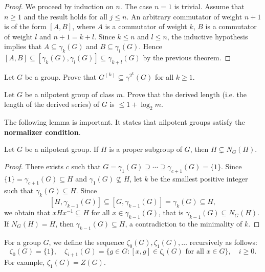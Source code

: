 \begin{proof}
We proceed by induction on $n$. The case $n=1$ is trivial. Assume that $n\geq1$ and 
the result holds for all $j\leq n$. An arbitrary commutator of weight $n+1$ 
is of the form $[A,B]$, where $A$ is a commutator of weight $k$,
$B$ is a commutator of weight $l$ and $n+1=k+l$. Since $k\leq n$ and $l\leq n$, 
the inductive hypothesis implies that  $A\subseteq \gamma_k(G)$ and $B\subseteq
\gamma_l(G)$. Hence $[A,B]\subseteq [\gamma_k(G),\gamma_l(G)]\subseteq
\gamma_{k+l}(G)$ by the previous theorem.
\end{proof}

\begin{exercise}
\label{xca:inclusion}
    Let $G$ be a group. Prove that $G^{(k)}\subseteq \gamma^{2^k}(G)$ for all $k\geq1$. 
\end{exercise}

\begin{exercise}
\label{xca:derived_length}
    Let $G$ be a nilpotent group of class $m$. Prove that
    the derived length (i.e. 
    the length of the derived series) of $G$ is $\leq 1+\log_2m$.
\end{exercise}

The following lemma is important. It states that nilpotent groups satisfy 
the \textbf{normalizer condition}. 

\begin{lemma}
\label{lem:normalizadora}
Let $G$ be a nilpotent group. If $H$ is a proper subgroup of $G$, then 
$H\subsetneq N_G(H)$.
\end{lemma}

\begin{proof}
There exists $c$ such that $G=\gamma_1(G)\supseteq\cdots\supseteq\gamma_{c+1}(G)=\{1\}$. Since 
$\{1\}=\gamma_{c+1}(G)\subseteq H$ and $\gamma_1(G)\not\subseteq H$, 
let $k$ be the smallest positive integer such that  $\gamma_k(G)\subseteq H$. 
Since
\[
[H,\gamma_{k-1}(G)]\subseteq [G,\gamma_{k-1}(G)]=\gamma_k(G)\subseteq H,
\]
we obtain that  
$xHx^{-1}\subseteq H$ for all $x\in\gamma_{k-1}(G)$,
that is $\gamma_{k-1}(G)\subseteq N_G(H)$. If $N_G(H)=H$, then
$\gamma_{k-1}(G)\subseteq H$, a contradiction to the minimality of $k$. 
\end{proof}

For a group $G$, we define the sequence  $\zeta_0(G),\zeta_1(G),\dots$
recursively as follows: 
\[
	\zeta_0(G)=\{1\},\quad
	\zeta_{i+1}(G)=\{g\in G:[x,g]\in\zeta_{i}(G)\text{ for all $x\in G$}\},\quad i\geq 0.
\]
For example, $\zeta_1(G)=Z(G)$.

